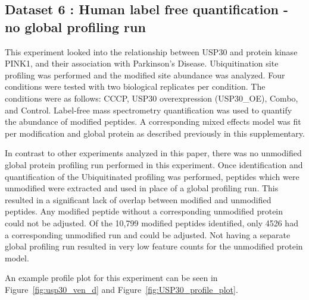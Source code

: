 \documentclass{mcp}
\def\sfigref#1{{Figure~\ref{#1}}}
\begin{document}
\clearpage

\subsection{Dataset 6 : Human label free quantification - no global profiling run}
\label{sec:usp30}

This experiment looked into the relationship between USP30 and protein kinase PINK1, and their association with Parkinson's Disease. Ubiquitination site profiling was performed and the modified site abundance was analyzed. Four conditions were tested with two biological replicates per condition. The conditions were as follows: CCCP, USP30 overexpression (USP30\_OE), Combo, and Control. Label-free mass spectrometry quantification was used to quantify the abundance of modified peptides. A corresponding mixed effects model was fit per modification and global protein as described previously in this supplementary.

In contrast to other experiments analyzed in this paper, there was no unmodified global protein profiling run performed in this experiment. Once identification and quantification of the Ubiquitinated profiling was performed, peptides which were unmodified were extracted and used in place of a global profiling run. This resulted in a significant lack of overlap between modified and unmodified peptides. Any modified peptide without a corresponding unmodified protein could not be adjusted. Of the 10,799 modified peptides identified, only 4526 had a corresponding unmodified run and could be adjusted. Not having a separate global profiling run resulted in very low feature counts for the unmodified protein model.

An example profile plot for this experiment can be seen in \sfigref{fig:usp30_ven_d} and \sfigref{fig:USP30_profile_plot}.
\end{document}
